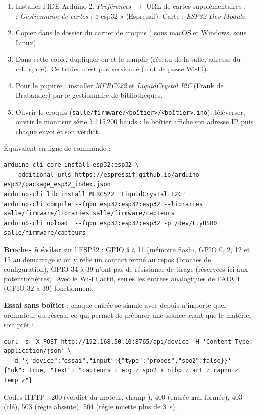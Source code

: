 \documentclass[11pt,a4paper]{article}
\begin{document}
\begin{enumerate}
  \item Installer l'IDE Arduino 2. \emph{Préférences} \(\to\) URL de cartes supplémentaires :\\
   ; \emph{Gestionnaire de cartes} :
  « esp32 » (Espressif). Carte : \emph{ESP32 Dev Module}.
  \item Copier  dans le dossier  du carnet de croquis
  ( sous macOS et Windows,  sous Linux).
  \item Dans cette copie, dupliquer  en  et le remplir
  (réseau de la salle, adresse du relais, clé). Ce fichier n'est pas versionné (mot de passe Wi-Fi).
  \item Pour le pupitre : installer \emph{MFRC522} et \emph{LiquidCrystal I2C} (Frank de Brabander) par le
  gestionnaire de bibliothèques.
  \item Ouvrir le croquis (\texttt{salle/firmware/<boîtier>/<boîtier>.ino}), téléverser, ouvrir le moniteur série à
  115\,200 bauds : le boîtier affiche son adresse IP puis chaque envoi et son verdict.
\end{enumerate}
Équivalent en ligne de commande :
\begin{Verbatim}
arduino-cli core install esp32:esp32 \
  --additional-urls https://espressif.github.io/arduino-esp32/package_esp32_index.json
arduino-cli lib install MFRC522 "LiquidCrystal I2C"
arduino-cli compile --fqbn esp32:esp32:esp32 --libraries salle/firmware/libraries salle/firmware/capteurs
arduino-cli upload  --fqbn esp32:esp32:esp32 -p /dev/ttyUSB0 salle/firmware/capteurs
\end{Verbatim}

\textbf{Broches à éviter} sur l'ESP32 : GPIO 6 à 11 (mémoire flash), GPIO 0, 2, 12 et 15 au démarrage si on y relie un
contact fermé au repos (broches de configuration), GPIO 34 à 39 n'ont pas de résistance de tirage (réservées ici
aux potentiomètres). Avec le Wi-Fi actif, seules les entrées analogiques de l'ADC1 (GPIO 32 à 39) fonctionnent.

\textbf{Essai sans boîtier} : chaque entrée se simule avec  depuis n'importe quel ordinateur du réseau,
ce qui permet de préparer une séance avant que le matériel soit prêt :
\begin{Verbatim}
curl -s -X POST http://192.168.50.10:8765/api/device -H 'Content-Type: application/json' \
  -d '{"device":"essai","input":{"type":"probes","spo2":false}}'
{"ok": true, "text": "capteurs : ecg ✓ spo2 ✗ nibp ✓ art ✓ capno ✓ temp ✓"}
\end{Verbatim}
Codes HTTP : 200 (verdict du moteur, champ \vp{ok}), 400 (entrée mal formée), 403 (clé), 503 (régie absente),
504 (régie muette plus de 3~s).
\end{document}
